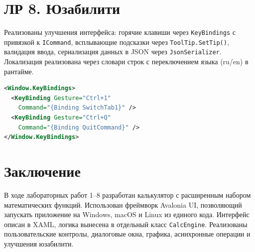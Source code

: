 \documentclass[14pt,a4paper]{extarticle}
\begin{document}
\section{ЛР 8. Юзабилити}

Реализованы улучшения интерфейса: горячие клавиши через \texttt{KeyBindings} с привязкой к \texttt{ICommand}, всплывающие подсказки через \texttt{ToolTip.SetTip()}, валидация ввода, сериализация данных в JSON через \texttt{JsonSerializer}. Локализация реализована через словари строк с переключением языка (ru/en) в рантайме.

\begin{lstlisting}[caption={Горячие клавиши в XAML},language=xml]
<Window.KeyBindings>
  <KeyBinding Gesture="Ctrl+1"
    Command="{Binding SwitchTab1}" />
  <KeyBinding Gesture="Ctrl+Q"
    Command="{Binding QuitCommand}" />
</Window.KeyBindings>
\end{lstlisting}

\section{Заключение}

В ходе лабораторных работ 1--8 разработан калькулятор с расширенным набором математических функций. Использован фреймворк Avalonia UI, позволяющий запускать приложение на Windows, macOS и Linux из единого кода. Интерфейс описан в XAML, логика вынесена в отдельный класс \texttt{CalcEngine}. Реализованы пользовательские контролы, диалоговые окна, графика, асинхронные операции и улучшения юзабилити.
\end{document}
